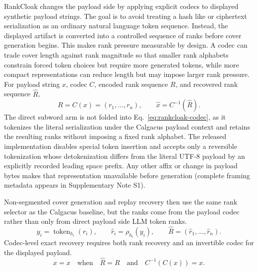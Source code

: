 \documentclass[fleqn,10pt]{wlscirep}
\begin{document}
RankCloak changes the payload side by applying explicit codecs to displayed synthetic payload strings. The goal is to avoid treating a hash like or ciphertext serialization as an ordinary natural language token sequence. Instead, the displayed artifact is converted into a controlled sequence of ranks before cover generation begins. This makes rank pressure measurable by design. A codec can trade cover length against rank magnitude so that smaller rank alphabets constrain forced token choices but require more generated tokens, while more compact representations can reduce length but may impose larger rank pressure.
For payload string \(x\), codec \(C\), encoded rank sequence \(R\), and recovered rank sequence \(\hat R\),
\begin{equation}
R=C(x)=(r_1,\ldots,r_n),
\qquad
\hat x=C^{-1}(\hat R).
\label{eq:rankcloak-codec}
\end{equation}
The direct subword arm is not folded into Eq.~\eqref{eq:rankcloak-codec}, as it tokenizes the literal serialization under the Calgacus payload context and retains the resulting ranks without imposing a fixed rank alphabet. The released implementation disables special token insertion and accepts only a reversible tokenization whose detokenization differs from the literal UTF-8 payload by an explicitly recorded leading space prefix. Any other affix or change in payload bytes makes that representation unavailable before generation (complete framing metadata appears in Supplementary Note S1).

Non-segmented cover generation and replay recovery then use the same rank selector as the Calgacus baseline, but the ranks come from the payload codec rather than only from direct payload side LLM token ranks.
\begin{equation}
y_i=\operatorname{token}_{h_i}(r_i),
\qquad
\hat r_i=\rho_{h_i}(y_i),
\qquad
\hat R=(\hat r_1,\ldots,\hat r_n).
\label{eq:rankcloak-nonseg}
\end{equation}
Codec-level exact recovery requires both rank recovery and an invertible codec for the displayed payload.
\begin{equation}
\hat x=x
\quad\text{when}\quad
\hat R=R
\quad\text{and}\quad
C^{-1}(C(x))=x.
\label{eq:codec-exact-recovery}
\end{equation}
\end{document}
